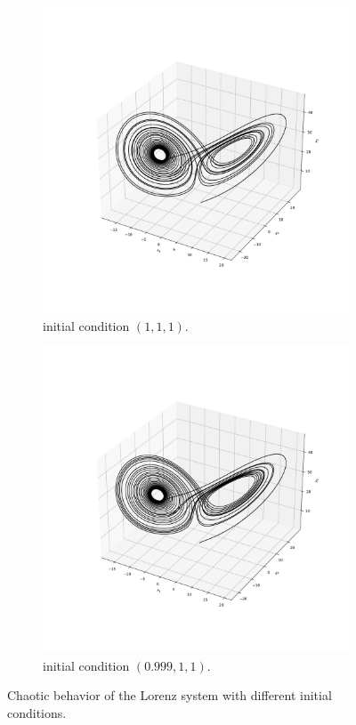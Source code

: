 \documentclass[11pt]{article}
\theoremstyle{definition}
\begin{document}
\begin{figure}
\centering
\begin{subfigure}{0.45\textwidth}
  \centering
  \includegraphics[trim=2cm 2cm 2cm 2cm, clip, scale=0.3]{Lorenz1.pdf}
  \caption{initial condition $(1,1,1)$.}
  \label{subfig1:mp}
\end{subfigure}\hfill
\begin{subfigure}{0.45\textwidth}
  \centering
  \includegraphics[trim=2cm 2cm 2cm 2cm, clip, scale=0.3]{Lorenz2.pdf}
  \caption{initial condition $(0.999,1,1)$.}
  \label{subfig2:mp}
\end{subfigure}
\caption{Chaotic behavior of the Lorenz system with different initial conditions.}
\label{fig:LE}
\end{figure}   
\end{document}
